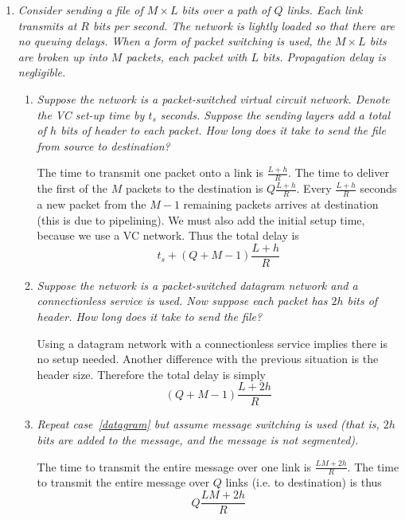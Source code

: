 \documentclass[11pt,a4paper]{article}
\begin{document}
\begin{enumerate}

  \item \emph{Consider sending a file of \(M \times L\) bits over a
    path of \(Q\) links. Each link transmits at \(R\) bits per
    second. The network is lightly loaded so that there are no queuing
    delays. When a form of packet switching is used, the \(M \times
    L\) bits are broken up into \(M\) packets, each packet with \(L\)
    bits. Propagation delay is negligible.}
    \begin{enumerate}

      \item \emph{Suppose the network is a packet-switched virtual
        circuit network. Denote the VC set-up time by \(t_s\)
        seconds. Suppose the sending layers add a total of \(h\) bits
        of header to each packet. How long does it take to send the
        file from source to destination?}

        The time to transmit one packet onto a link is \(\frac{L +
          h}{R}\). The time to deliver the first of the \(M\) packets
        to the destination is \(Q{\frac{L+h}{R}}\). Every
        \(\frac{L+h}{R}\) seconds a new packet from the \(M-1\)
        remaining packets arrives at destination (this is due to
        pipelining). We must also add the initial setup time, because
        we use a VC network. Thus the total delay is
        \[
          t_{s} + (Q + M - 1){\frac{L+h}{R}}
        \]

      \item \label{datagram} \emph{Suppose the network is a
        packet-switched datagram network and a connectionless service
        is used. Now suppose each packet has \(2h\) bits of
        header. How long does it take to send the file?}

        Using a datagram network with a connectionless service implies
        there is no setup needed. Another difference with the previous
        situation is the header size. Therefore the total delay is
        simply
        \[
          (Q + M - 1){\frac{L + 2h}{R}}
        \]

      \item \emph{Repeat case~\ref{datagram} but assume message
        switching is used (that is, \(2h\) bits are added to the
        message, and the message is not segmented).}

        The time to transmit the entire message over one link is
        \(\frac{L M + 2h}{R}\). The time to transmit the entire
        message over \(Q\) links (i.e. to destination) is thus
        \[
          Q{\frac{L M + 2h}{R}}
        \]


\end{enumerate}
\end{enumerate}
\end{document}
